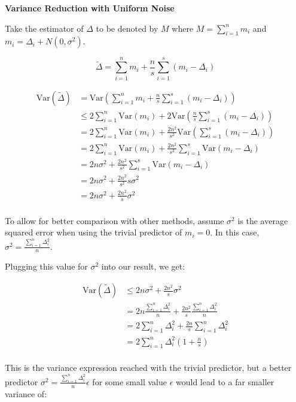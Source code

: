\documentclass[11pt]{article}
\newcommand{\subsubsubsection}[1]{
  \vspace{1em} %
  \noindent\textbf{#1} %
  \vspace{0.5em} %
}
\begin{document}
\subsubsubsection{Variance Reduction with Uniform Noise}

Take the estimator of $\Delta$ to be denoted by $M$ where $M = \sum_{i = 1}^{n} m_i$ and $m_i = \Delta_i + N(0, \sigma^2)$.

\[
\tilde{\Delta} = \sum_{i = 1}^{n} m_i + \frac{n}{s} \sum_{i = 1}^{s} (m_i - \Delta_i)
\]

\[
\begin{aligned}
\mathrm{Var}(\tilde{\Delta}) &= \mathrm{Var}( \sum_{i = 1}^{n} m_i + \frac{n}{s} \sum_{i = 1}^{s} (m_i - \Delta_i)) \\
&\leq 2\sum_{i = 1}^{n} \mathrm{Var}(m_i) + 2\mathrm{Var}(\frac{n}{s} \sum_{i = 1}^{s} (m_i - \Delta_i)) \\
&= 2\sum_{i = 1}^{n} \mathrm{Var}(m_i) + \frac{2n^2}{s^2} \mathrm{Var}(\sum_{i = 1}^{s} (m_i - \Delta_i)) \\
&= 2\sum_{i = 1}^{n} \mathrm{Var}(m_i) + \frac{2n^2}{s^2} \sum_{i = 1}^{s} \mathrm{Var}(m_i - \Delta_i) \\
&= 2n \sigma^2 + \frac{2n^2}{s^2} \sum_{i = 1}^{s} \mathrm{Var}(m_i - \Delta_i) \\
&= 2n \sigma^2 + \frac{2n^2}{s^2} s \sigma^2 \\
&= 2n \sigma^2 + \frac{2n^2}{s} \sigma^2 \\
\end{aligned}
\]

To allow for better comparison with other methods, assume $\sigma^2$ is the average squared error when using the trivial predictor of $m_i = 0$.
In this case, $\sigma^2 = \frac{\sum_{i = 1}^{n}\Delta_i^2}{n}$.

Plugging this value for $\sigma^2$ into our result, we get:

\[
\begin{aligned}
\mathrm{Var}(\tilde{\Delta}) &\leq 2n \sigma^2 + \frac{2n^2}{s} \sigma^2 \\
&= 2n \frac{\sum_{i = 1}^{n}\Delta_i^2}{n} + \frac{2n^2}{s} \frac{\sum_{i = 1}^{n}\Delta_i^2}{n} \\
&= 2\sum_{i = 1}^{n}\Delta_i^2 + \frac{2n}{s} \sum_{i = 1}^{n}\Delta_i^2 \\
&= 2\sum_{i = 1}^{n}\Delta_i^2(1 + \frac{n}{s}) \\
\end{aligned}
\]

This is the variance expression reached with the trivial predictor, but a better predictor $\sigma^2 = \frac{\sum_{i = 1}^{n}\Delta_i^2}{n} \epsilon$ for some small value $\epsilon$ would lead to a far smaller variance of:
\end{document}
